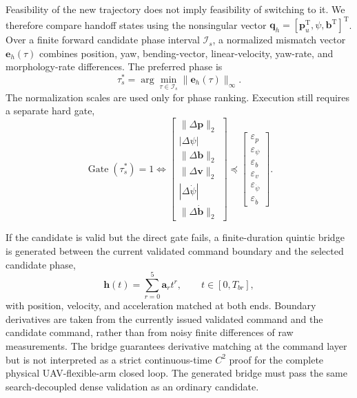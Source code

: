 \documentclass[journal,twoside]{IEEEtran}
\begin{document}
Feasibility of the new trajectory does not imply feasibility of switching to it. We therefore compare handoff states using the nonsingular vector $\mathbf q_h=[\mathbf p_u^{\mathrm T},\psi,\mathbf b^{\mathrm T}]^{\mathrm T}$. Over a finite forward candidate phase interval $\mathcal I_s$, a normalized mismatch vector $\mathbf e_h(\tau)$ combines position, yaw, bending-vector, linear-velocity, yaw-rate, and morphology-rate differences. The preferred phase is
\begin{equation}
\tau_s^*=\arg\min_{\tau\in\mathcal I_s}\|\mathbf e_h(\tau)\|_\infty.
\label{eq:phase_match}
\end{equation}
The normalization scales are used only for phase ranking. Execution still requires a separate hard gate,
\begin{equation}
\operatorname{Gate}(\tau_s^*)=1
\iff
\begin{bmatrix}
\|\Delta\mathbf p\|_2\\|\Delta\psi|\\\|\Delta\mathbf b\|_2\\
\|\Delta\mathbf v\|_2\\|\Delta\dot\psi|\\\|\Delta\dot{\mathbf b}\|_2
\end{bmatrix}
\preceq
\begin{bmatrix}
\varepsilon_p\\\varepsilon_\psi\\\varepsilon_b\\
\varepsilon_v\\\varepsilon_{\dot\psi}\\\varepsilon_{\dot b}
\end{bmatrix}.
\label{eq:handoff_gate}
\end{equation}

If the candidate is valid but the direct gate fails, a finite-duration quintic bridge is generated between the current validated command boundary and the selected candidate phase,
\begin{equation}
\mathbf h(t)=\sum_{r=0}^{5}\mathbf a_rt^r,
\qquad t\in[0,T_{br}],
\label{eq:quintic_bridge}
\end{equation}
with position, velocity, and acceleration matched at both ends. Boundary derivatives are taken from the currently issued validated command and the candidate command, rather than from noisy finite differences of raw measurements. The bridge guarantees derivative matching at the command layer but is not interpreted as a strict continuous-time $C^2$ proof for the complete physical UAV-flexible-arm closed loop. The generated bridge must pass the same search-decoupled dense validation as an ordinary candidate.
\end{document}
